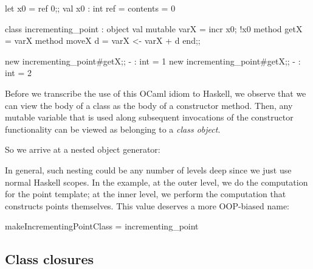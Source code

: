 \begin{code}
 let x0 = ref 0;;
 val x0 : int ref = {contents = 0}
\end{code}

\begin{code}
 class incrementing_point :
   object
     val mutable varX = incr x0; !x0
     method getX      = varX
     method moveX d   = varX <- varX + d
   end;;
\end{code}

\begin{code}
 new incrementing_point#getX;;
 - : int = 1
 new incrementing_point#getX;;
 - : int = 2
\end{code}

\noindent
Before we transcribe the use of this OCaml idiom to Haskell, we
observe that we can view the body of a class as the body of a
constructor method. Then, any mutable variable that is used along
subsequent invocations of the constructor functionality can be viewed
as belonging to a \emph{class object}.

So we arrive at a nested object generator:

\noindent
In general, such nesting could be any number of levels deep since we
just use normal Haskell scopes. In the example, at the outer level, we
do the computation for the point template; at the inner level, we
perform the computation that constructs points themselves. This value
deserves a more OOP-biased name:

\begin{code}
 makeIncrementingPointClass = incrementing_point
\end{code}






\medskip

\subsection{Class closures}

